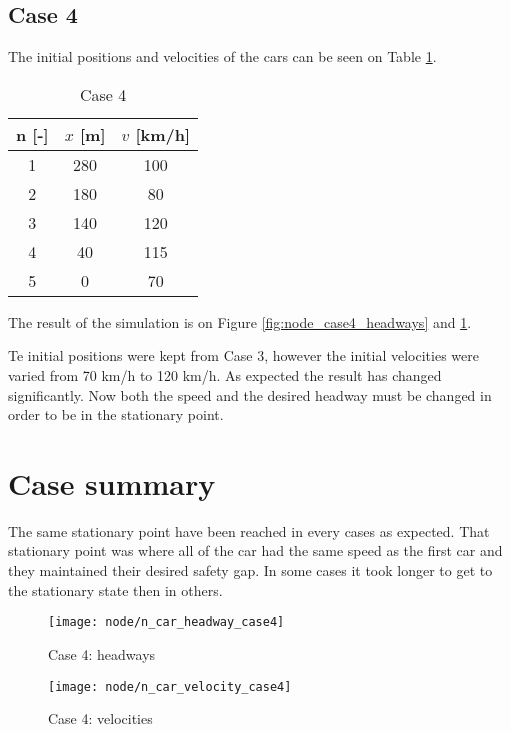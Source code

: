 		\subsection*{Case 4}
		The initial positions and velocities of the cars can be seen on Table \ref{tab:node_case4}.
		\begin{table}
			\centering
			\begin{tabular}{ |c|c|c| }
				\hline
				n [-] & $x$ [m] & $v$ [km/h]\\
				\hline
				1 &  280 & 100 \\
				2 & 180 & 80 \\
				3 & 140 & 120 \\
				4 & 40 & 115 \\
				5 & 0 & 70 \\
				\hline
			\end{tabular}
			\caption{Case 4}
			\label{tab:node_case4}
		\end{table}
		The result of the simulation is on Figure \ref{fig:node_case4_headways} and \ref{fig:node_case4_velocities}. 

		Te initial positions were kept from Case 3, however the initial velocities were varied from 70 km/h to 120 km/h. As expected the result has changed significantly. Now both the speed and the desired headway must be changed in order to be in the stationary point.
		\section*{Case summary}
		The same stationary point have been reached in every cases as expected. That stationary point was where all of the car had the same speed as the first car and they maintained their desired safety gap. In some cases it took longer to get to the stationary state then in others.
		\begin{figure}
			\centering
			\begin{minipage}{.5\textwidth}
				\centering
				\texttt{[image: node/n\_car\_headway\_case4]}
				\caption{Case 4: headways}
				\label{fig:node_case4_headways}
			\end{minipage}\hfill
			\begin{minipage}{.5\textwidth}
				\centering
				\texttt{[image: node/n\_car\_velocity\_case4]}
				\caption{Case 4: velocities}
				\label{fig:node_case4_velocities}
			\end{minipage}
		\end{figure}
